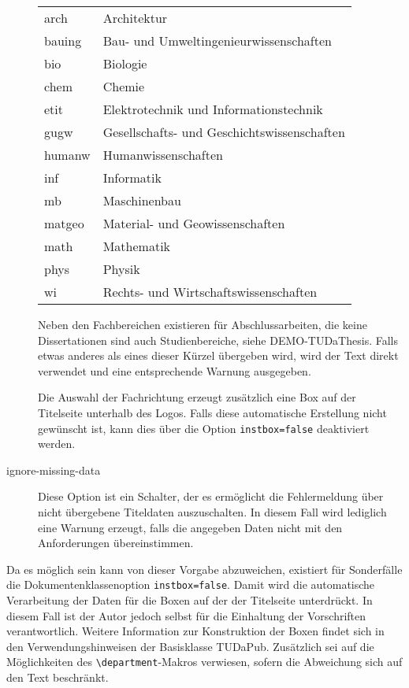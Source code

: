 \documentclass[
	german,%
	ruledheaders=chapter,%
	class=book,%
	thesis={%
			type=dr,
			dr=rernat
		},
	fontsize=11pt,%
	parskip=half-,%
	custommargins=true,%
	marginpar=false,%
	accentcolor=9c,%
]{tudapub}
\let\code\texttt
\begin{document}
\begin{description}
	      \begin{tabular}{@{}l@{${}\to{}$}l@{}}
		      arch  & Architektur\\
		      bauing& Bau- und Umweltingenieurwissenschaften\\
		      bio   &Biologie\\
		      chem  &Chemie\\
		      etit  &Elektrotechnik und Informationstechnik\\
		      gugw  &Gesellschafts- und Geschichtswissenschaften\\
		      humanw&Humanwissenschaften\\
		      inf   &Informatik\\
		      mb    &Maschinenbau\\
		      matgeo&Material- und Geowissenschaften\\
		      math  &Mathematik\\
		      phys  &Physik\\
		      wi    &Rechts- und Wirtschaftswissenschaften
	      \end{tabular}

	      Neben den Fachbereichen existieren für Abschlussarbeiten, die keine Dissertationen sind auch Studienbereiche, siehe DEMO-TUDaThesis.
	      Falls etwas anderes als eines dieser Kürzel übergeben wird, wird der Text direkt verwendet und eine entsprechende Warnung ausgegeben.

	      Die Auswahl der Fachrichtung erzeugt zusätzlich eine Box auf der Titelseite unterhalb des Logos. Falls diese automatische Erstellung nicht gewünscht ist, kann dies über die Option \code{instbox=false} deaktiviert werden.
	\item[ignore-missing-data] Diese Option ist ein Schalter, der es ermöglicht die Fehlermeldung über nicht übergebene Titeldaten auszuschalten. In diesem Fall wird lediglich eine Warnung erzeugt, falls die angegeben Daten nicht mit den Anforderungen übereinstimmen.
\end{description}

Da es möglich sein kann von dieser Vorgabe abzuweichen, existiert für Sonderfälle die Dokumentenklassenoption \code{instbox=false}. Damit wird die automatische Verarbeitung der Daten für die Boxen auf der der Titelseite unterdrückt. In diesem Fall ist der Autor jedoch selbst für die Einhaltung der Vorschriften verantwortlich. Weitere Information zur Konstruktion der Boxen findet sich in den Verwendungshinweisen der Basisklasse TUDaPub. Zusätzlich sei auf die Möglichkeiten des \code{\textbackslash{}department}-Makros verwiesen, sofern die Abweichung sich auf den Text beschränkt.
\end{document}
